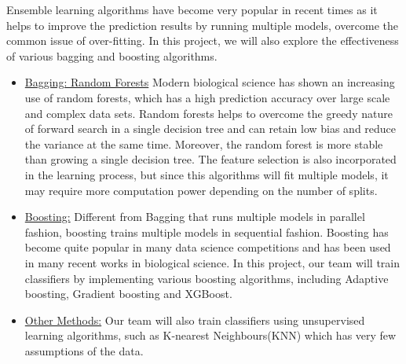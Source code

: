 \documentclass[a4paper, 12pt]{article}
\begin{document}
    Ensemble learning algorithms have become very popular in recent times as it helps to improve the prediction results by running multiple models, overcome the common issue of over-fitting. In this project, we will also explore the effectiveness of various bagging and boosting algorithms.
    
\begin {itemize}
    \item \underline{Bagging: Random Forests} Modern biological science has shown an increasing use of random forests, which has a high prediction accuracy over large scale and complex data sets. Random forests helps to overcome the greedy nature of forward search in a single decision tree and can retain low bias and reduce the variance at the same time. Moreover, the random forest is more stable than growing a single decision tree. The feature selection is also incorporated in the learning process, but since this algorithms will fit multiple models, it may require more computation power depending on the number of splits.
    \item \underline{Boosting:} Different from Bagging that runs multiple models in parallel fashion, boosting trains multiple models in sequential fashion. Boosting has become quite popular in many data science competitions and has been used in many recent works in biological science. In this project, our team will train classifiers by implementing various boosting algorithms, including Adaptive boosting, Gradient boosting and XGBoost.
    \item \underline{Other Methods:}
    Our team will also train classifiers using unsupervised learning algorithms, such as K-nearest Neighbours(KNN) which has very few assumptions of the data.
\end{itemize}
\end{document}
